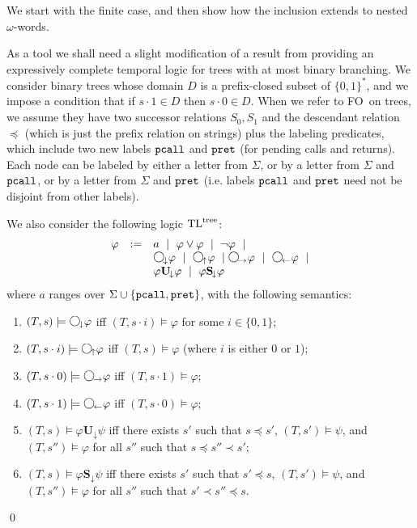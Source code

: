 \documentclass{LMCS}
\newcommand{\aProof}[2]{\vspace{2mm}{\noindent\em Proof of
#1.~}#2\qed}
\newcommand{\X}{{\mathbf X}}
\newcommand{\U}{{\mathbf U}}
\renewcommand{\S}{{\mathbf S}}
\newcommand{\next}{\text{\raisebox{1pt}{$\bigcirc$}}}
\renewcommand{\X}{\next}
\newcommand{\Xd}{\X_{\!\downarrow}}
\newcommand{\Xr}{\X_{\!\rightarrow}}
\newcommand{\Yd}{\X_{\!\uparrow}}
\newcommand{\Yr}{\X_{\!\leftarrow}}
\newcommand{\Ud}{\U_{\!\downarrow}}
\newcommand{\Sd}{\S_{\!\downarrow}}
\newcommand{\FO}{{\rm FO}}
\renewcommand{\phi}{\varphi}
\theoremstyle{plain}
\theoremstyle{definition}
\newcommand{\pret}{\tt{pret}}
\newcommand{\pcall}{\tt{pcall}}
\newcommand{\tltree}{\text{\rm TL}^{\text{\rm tree}}}
\begin{document}
\aProof{Lemma \ref{nwtl-lemma-two}}{We start with the finite case,
and then show how the inclusion extends to nested $\omega$-words.

As a tool we shall need a slight modification of a result from
\cite{Schl92,marx-pods04} providing an expressively complete temporal
logic for trees with at most binary branching.  We consider binary
trees whose domain $D$ is a prefix-closed subset of $\{0,1\}^*$, and
we impose a condition that if $s\cdot 1\in D$ then $s\cdot 0\in D$.
When we refer to \FO\ on trees, we assume they have two successor
relations $S_0, S_1$ and the descendant relation $\preceq$ (which is
just the prefix relation on strings) plus the labeling predicates,
which include two new labels $\pcall$ and $\pret$ (for pending calls
and returns). Each node can be labeled 
by either a letter from $\Sigma$, or by a letter from $\Sigma$ and
$\pcall$, or by a letter from $\Sigma$ and $\pret$ (i.e. labels
$\pcall$ and $\pret$ need not be disjoint from other labels).


We also consider the following logic $\tltree$:
$$
\begin{array}{rcl}
\phi & \mbox{:=} & a\ \mid\ \phi\vee \phi\ \mid\ \neg\phi\ \mid\\
&& \Xd\phi \ \mid\ \Yd\phi \ \mid \Xr\phi\ \mid\ \Yr\phi\ \mid\\
&& \phi\Ud\phi\ \mid\ \phi\Sd\phi
\end{array}
$$
where $a$ ranges over $\Sigma\cup\{\pcall,\pret\}$, with the following semantics:
\begin{enumerate}[$\bullet$]
\item $(T,s)\models \Xd\phi$ iff $(T,s\cdot i)\models \phi$ for some $i\in\{0,1\}$;
\item $(T,s\cdot i)\models \Yd\phi$ iff $(T,s)\models \phi$ (where
  $i$ is either $0$ or $1$);
\item $(T,s\cdot 0)\models \Xr\phi$ iff $(T,s \cdot 1)\models \phi$;
\item $(T,s\cdot 1)\models \Yr\phi$ iff $(T,s \cdot 0)\models \phi$;
\item $(T, s)\models \phi\Ud \psi$ iff there exists $s'$ such that $s
  \preceq s'$, $(T,s')\models \psi$, and $(T,s'')\models \phi$ for all
  $s''$ such that $s \preceq s'' \prec s'$;
\item $(T, s)\models \phi\Sd \psi$ iff there exists $s'$ such that $s'
  \preceq s$, $(T,s')\models \psi$, and $(T,s'')\models \phi$ for all
  $s''$ such that $s' \prec s'' \preceq s$.
\end{enumerate}

}
\end{document}
